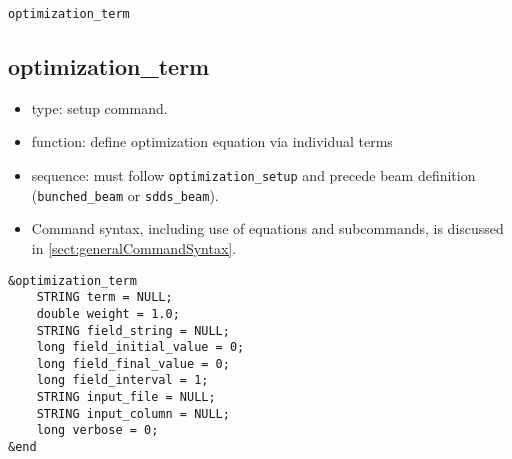 \documentclass[11pt]{article}
\begin{document}
\newpage
\begin{center}{\Large\verb|optimization_term|}\end{center}
\subsection{optimization\_term \label{subsec:optimizationterm}}

\begin{itemize}
\item type: setup command.
\item function: define optimization equation via individual terms
\item sequence: must follow \verb|optimization_setup| and precede beam definition (\verb|bunched_beam| or \verb|sdds_beam|).
\item Command syntax, including use of equations and subcommands, is discussed in \ref{sect:generalCommandSyntax}.
\end{itemize}

\begin{verbatim}
&optimization_term
    STRING term = NULL;
    double weight = 1.0;
    STRING field_string = NULL;
    long field_initial_value = 0;
    long field_final_value = 0;
    long field_interval = 1;
    STRING input_file = NULL;
    STRING input_column = NULL;
    long verbose = 0;
&end
\end{verbatim}
\end{document}
